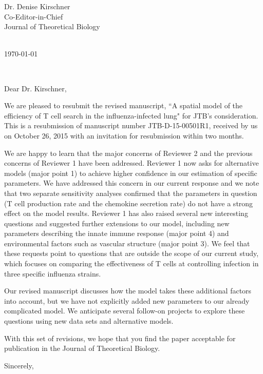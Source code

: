 \documentclass[11pt,a4paper]{letter} %
\def\opening#1{\thispagestyle{empty}
{\centering\fromaddress \vspace{0.6in} \\ %
\hspace*{\longindentation}\today\hspace*{\fill}\par} %
{\raggedright \toname \\ \toaddress \par} %
\vspace{0.4in} %
\noindent #1 %
}
\begin{document}

\begin{letter}
{Dr. Denise Kirschner \\
Co-Editor-in-Chief \\
Journal of Theoretical Biology
}


\opening{Dear Dr. Kirschner,}

We are pleased to resubmit the revised manuscript, ``A spatial model of the
efficiency of T cell search in the influenza-infected lung" for JTB's 
consideration. This is a resubmission of manuscript number JTB-D-15-00501R1,
received by us on October 26, 2015 with an invitation for resubmission within 
two months. 

We are happy to learn that the major concerns of Reviewer 2 and the previous 
concerns of Reviewer 1 have been addressed. Reviewer 1 now asks for alternative
models (major point 1) to achieve higher confidence in our estimation of specific
parameters. We have addressed this concern in our current response and we 
note that two separate sensitivity analyses confirmed that the parameters in 
question (T cell production rate and the chemokine secretion rate) do not have 
a strong effect on the model results. Reviewer 1 has also raised several new 
interesting questions and suggested further extensions to our model, including
new parameters describing the innate immune response (major point 4) and 
environmental factors such as vascular structure (major point 3).  We feel that these 
requests point to questions that are outside the scope of our current study, 
which focuses on comparing the effectiveness of T cells at controlling infection
in three specific influenza strains. 

Our revised manuscript discusses how the model takes these additional factors
into account, but we have not explicitly added new parameters to our already 
complicated model. We anticipate several follow-on projects to explore these 
questions using new data sets and alternative models.  

With this set of revisions, we hope that you find the paper acceptable 
for publication in the Journal of Theoretical Biology.

\closing{Sincerely,}


\end{letter}
\end{document}
